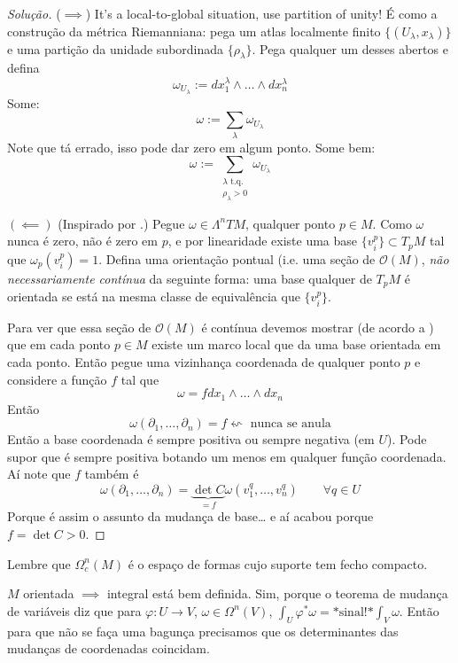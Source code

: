 \begin{proof}[Solução]\leavevmode
 (\(\implies\)) It's a local-to-global situation, use partition of unity! É como a construção da métrica Riemanniana: pega um atlas localmente finito \(\{(U_\lambda,x_\lambda)\}\) e uma partição da unidade subordinada \(\{\rho_\lambda\}\). Pega qualquer um desses abertos e defina
 \[\omega_{U_\lambda}:=dx_1^{\lambda} \wedge \ldots \wedge dx_n^{\lambda}\]
Some:
\[\omega:=\sum_\lambda \omega_{U_\lambda}\]
Note que tá errado, isso pode dar zero em algum ponto. Some bem:
\[\omega:=\sum_{\substack{ \lambda\text{ t.q.}  \\ \rho_\lambda>0}}\omega_{U_\lambda}\]

\((\impliedby)\) (Inspirado por \cite{les}.) Pegue \(\omega \in \Lambda^{n}TM\), qualquer ponto \(p \in M\). Como \(\omega\) nunca é zero, não é zero em \(p\), e por linearidade existe uma base \(\{v^p_i\}\subset T_pM\) tal que \(\omega_p(v^p_i)=1\). Defina uma orientação pontual (i.e. uma seção de \(\mathcal{O}(M)\), \textit{não necessariamente contínua} da seguinte forma: uma base qualquer de \(T_pM\) é orientada se está na mesma classe de equivalência que \(\{v^p_i\}\).

Para ver que essa seção de \(\mathcal{O}(M)\) é contínua devemos mostrar (de acordo a \cite{les}) que em cada ponto \(p\in M\) existe um marco local que da uma base orientada em cada ponto. Então pegue uma vizinhança coordenada de qualquer ponto \(p\) e considere a função \(f\) tal que
\[\omega=fdx_1 \wedge \ldots \wedge dx_n\]
Então
\[\omega(\partial_1,\ldots, \partial_n)=f \leftsquigarrow \text{ nunca se anula} \]
Então a base coordenada é sempre positiva ou sempre negativa (em \(U\)). Pode supor que é sempre positiva botando um menos em qualquer função coordenada.  Aí note que \(f\) também é
\[\omega(\partial_1,\ldots,\partial_n)=\underbrace{\det C}_{=f}\omega(v^q_1,\ldots,v^q_n) \qquad  \forall  q \in U\]
Porque é assim o assunto da mudança de base… e aí acabou porque \(f=\det C>0\).

\end{proof}

Lembre que \(\Omega_c^n(M)\) é o espaço de formas cujo suporte tem fecho compacto.

\begin{remark}\leavevmode
\(M\) orientada \(\implies\) integral está bem definida. Sim, porque o teorema de mudança de variáveis diz que para \(\varphi: U \to V\), \(\omega \in \Omega^{n}(V)\), \(\int_U \varphi^*\omega=\text{*sinal!*}\int_V \omega \). Então para que não se faça uma bagunça precisamos que os determinantes das mudanças de coordenadas coincidam.
\end{remark}

